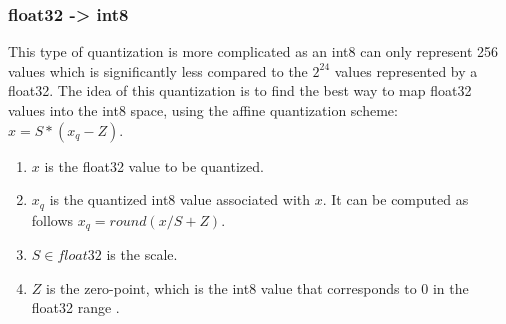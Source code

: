 \documentclass[licencjacka,en]{pracamgr}
\begin{document}
\subsubsection{float32 -> int8}
This type of quantization is more complicated as an int8 can only represent 256 values which is significantly less compared to the $ 2^24 $  values represented by a float32. The idea of this quantization is to find the best way to map float32 values into the int8 space, using the affine quantization scheme: $ x = S * (x_q - Z) $. 
\begin{enumerate}
	\item $ x $ is the float32 value to be quantized.
	\item  $ x_q $ is the quantized int8 value associated with $ x $. It can be computed as follows $ x_q = round(x/S + Z) $.	
	\item $ S \in float32$ is the scale.
	\item $ Z $ is the zero-point, which is the int8 value that corresponds to 0 in the float32 range \cite{quant_hf}.
\end{enumerate}
\end{document}

